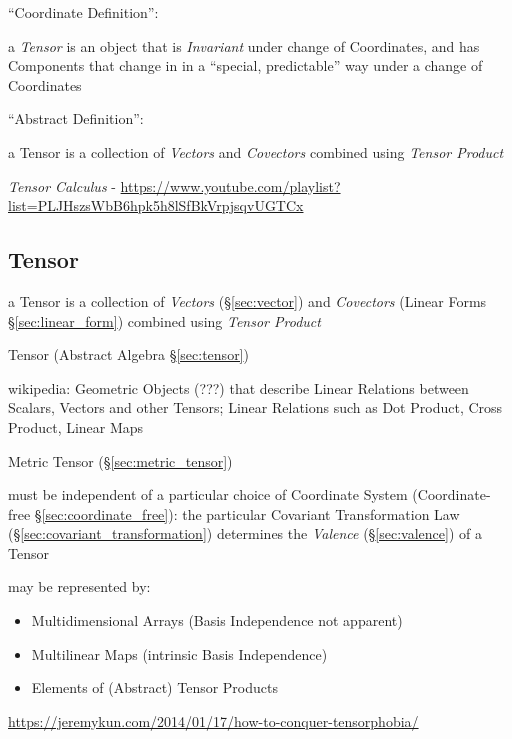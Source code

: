 ``Coordinate Definition'':

a \emph{Tensor} is an object that is \emph{Invariant} under change of
Coordinates, and has Components that change in in a ``special, predictable'' way
under a change of Coordinates

``Abstract Definition'':

a Tensor is a collection of \emph{Vectors} and \emph{Covectors} combined using
\emph{Tensor Product}

\emph{Tensor Calculus} -
\url{https://www.youtube.com/playlist?list=PLJHszsWbB6hpk5h8lSfBkVrpjsqvUGTCx}



\subsection{Tensor}\label{sec:linear_tensor}

a Tensor is a collection of \emph{Vectors} (\S\ref{sec:vector}) and
\emph{Covectors} (Linear Forms \S\ref{sec:linear_form}) combined using
\emph{Tensor Product}

\fist Tensor (Abstract Algebra \S\ref{sec:tensor})

wikipedia: Geometric Objects (???) that describe Linear Relations
between Scalars, Vectors and other Tensors; Linear Relations such as
Dot Product, Cross Product, Linear Maps


\fist Metric Tensor (\S\ref{sec:metric_tensor})

must be independent of a particular choice of Coordinate System
(Coordinate-free \S\ref{sec:coordinate_free}): the particular Covariant
Transformation Law (\S\ref{sec:covariant_transformation}) determines
the \emph{Valence} (\S\ref{sec:valence}) of a Tensor

may be represented by:
\begin{itemize}
  \item Multidimensional Arrays (Basis Independence not apparent)
  \item Multilinear Maps (intrinsic Basis Independence)
  \item Elements of (Abstract) Tensor Products
\end{itemize}

\fist
\url{https://jeremykun.com/2014/01/17/how-to-conquer-tensorphobia/}

